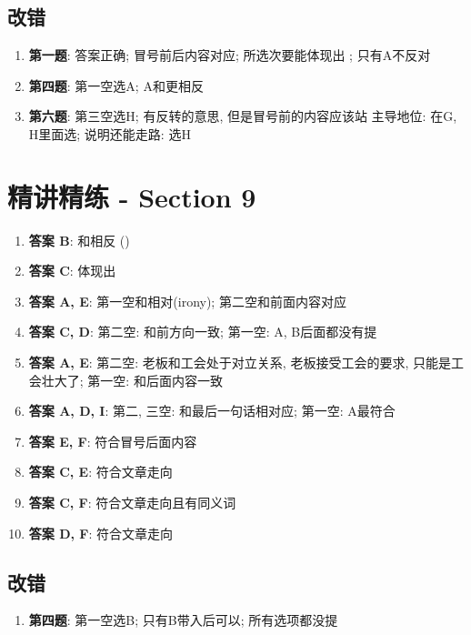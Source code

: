   \subsection{改错}

    \begin{enumerate}
      \item \textbf{第一题}: 答案正确; 冒号前后内容对应; 所选次要能体现出
      ; 只有A不反对
      \item \textbf{第四题}: 第一空选A; A和更相反
      \item \textbf{第六题}: 第三空选H; 有反转的意思, 但是冒号前的内容应该站
      主导地位: 在G, H里面选; 说明还能走路: 选H
    \end{enumerate}

\section{精讲精练 - Section 9}

  \begin{enumerate}
    \item \textbf{答案 B}: 和相反 ()
    \item \textbf{答案 C}: 体现出
    \item \textbf{答案 A, E}: 第一空和相对(irony);
    第二空和前面内容对应
    \item \textbf{答案 C, D}: 第二空: 和前方向一致; 第一空: A, B后面都没有提
    \item \textbf{答案 A, E}: 第二空: 老板和工会处于对立关系, 老板接受工会的要求,
    只能是工会壮大了; 第一空: 和后面内容一致
    \item \textbf{答案 A, D, I}: 第二, 三空: 和最后一句话相对应; 第一空: A最符合
    \item \textbf{答案 E, F}: 符合冒号后面内容
    \item \textbf{答案 C, E}: 符合文章走向
    \item \textbf{答案 C, F}: 符合文章走向且有同义词
    \item \textbf{答案 D, F}: 符合文章走向
  \end{enumerate}

  \subsection{改错}

    \begin{enumerate}
      \item \textbf{第四题}: 第一空选B; 只有B带入后可以; 所有选项都没提
    \end{enumerate}
